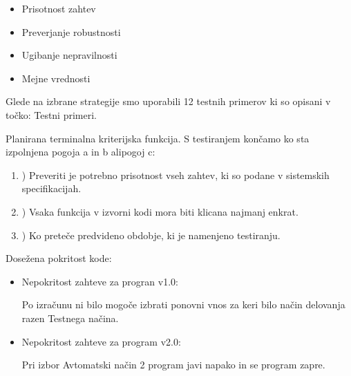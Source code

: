 \documentclass[a4paper,12pt]{article}
\begin{document}
		\begin{itemize}
			\item Prisotnost zahtev
			\item Preverjanje robustnosti
			\item Ugibanje nepravilnosti
			\item Mejne vrednosti
		\end{itemize}
		
		\hspace{-0.8cm} 
		
		\vspace{0.3cm}

		\qquad Glede na izbrane strategije smo uporabili 12 testnih primerov 
				ki so opisani v točko: Testni primeri.

		\vspace{0.5cm}

		\hspace{-0.8cm} 
		
		\vspace{0.3cm}

		\qquad Planirana terminalna kriterijska funkcija.  S  testiranjem  končamo ko sta izpolnjena pogoja a in b  alipogoj c:

			\begin{enumerate}[label=\alph*]
					\item) Preveriti je potrebno prisotnost vseh zahtev, ki so podane v sistemskih specifikacijah.
					\item) Vsaka funkcija v izvorni kodi mora biti klicana najmanj enkrat.
					\item) Ko preteče predvideno obdobje, ki je namenjeno testiranju.
			\end{enumerate}

\newpage

		\qquad Dosežena pokritost kode:

			\begin{itemize}
				\item Nepokritost zahteve za progran v1.0:

				\qquad Po izračunu ni bilo mogoče izbrati ponovni vnos za keri bilo način delovanja razen Testnega načina. 

				\item Nepokritost zahteve za program v2.0:
			
				\qquad Pri izbor Avtomatski način 2 program javi napako in se program zapre.
			\end{itemize}
\end{document}
